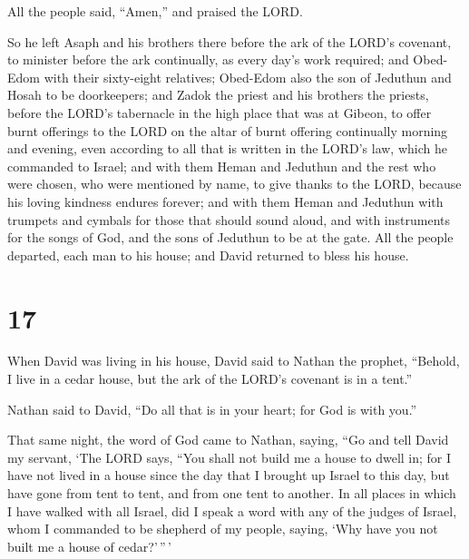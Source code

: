 All the people said, ``Amen,'' and praised the LORD.

 So he left Asaph and his brothers there before the ark of
the LORD's covenant, to minister before the ark continually, as every
day's work required;  and Obed-Edom with their sixty-eight
relatives; Obed-Edom also the son of Jeduthun and Hosah to be
doorkeepers;  and Zadok the priest and his brothers the
priests, before the LORD's tabernacle in the high place that was at
Gibeon,  to offer burnt offerings to the LORD on the altar
of burnt offering continually morning and evening, even according to all
that is written in the LORD's law, which he commanded to Israel;
 and with them Heman and Jeduthun and the rest who were
chosen, who were mentioned by name, to give thanks to the LORD, because
his loving kindness endures forever;  and with them Heman
and Jeduthun with trumpets and cymbals for those that should sound
aloud, and with instruments for the songs of God, and the sons of
Jeduthun to be at the gate.  All the people departed, each
man to his house; and David returned to bless his house.

\hypertarget{section-16}{%
\section{17}\label{section-16}}

 When David was living in his house, David said to Nathan
the prophet, ``Behold, I live in a cedar house, but the ark of the
LORD's covenant is in a tent.''

 Nathan said to David, ``Do all that is in your heart; for
God is with you.''

 That same night, the word of God came to Nathan, saying,
 ``Go and tell David my servant, `The LORD says, ``You shall
not build me a house to dwell in;  for I have not lived in a
house since the day that I brought up Israel to this day, but have gone
from tent to tent, and from one tent to another.  In all
places in which I have walked with all Israel, did I speak a word with
any of the judges of Israel, whom I commanded to be shepherd of my
people, saying, `Why have you not built me a house of cedar?'\,''\,'

